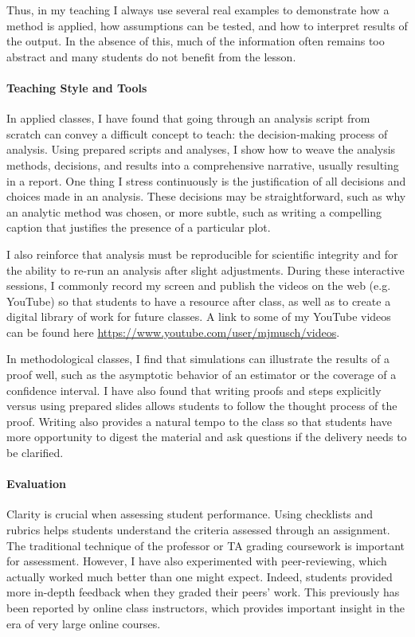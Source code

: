 \documentclass[12pt,a4paper]{article}
\begin{document}
Thus, in my teaching I always use several real examples to demonstrate how a method is applied, how assumptions can be tested, and how to interpret results of the output. In the absence of this, much of the information often remains too abstract and many students do not benefit from the lesson.


\vspace{-1em}
\paragraph{Teaching Style and Tools} In applied classes, I have found that going through an analysis script from scratch can convey a difficult concept to teach: the decision-making process of analysis.  Using prepared scripts and analyses, I show how to weave the analysis methods, decisions, and results into a comprehensive narrative, usually resulting in a report.  One thing I stress continuously is the justification of all decisions and choices made in an analysis.  These decisions may be straightforward, such as why an analytic method was chosen, or more subtle, such as writing a compelling caption that justifies the presence of a particular plot.  

I also reinforce that analysis must be reproducible for scientific integrity and for the ability to re-run an analysis after slight adjustments. During these interactive sessions, I commonly record my screen and publish the videos on the web (e.g. YouTube) so that students to have a resource after class, as well as to create a digital library of work for future classes.  A link to some of my YouTube videos can be found here \url{https://www.youtube.com/user/mjmusch/videos}.

In methodological classes, I find that simulations can illustrate the results of a proof well, such as the asymptotic behavior of an estimator or the coverage of a confidence interval.  I have also found that writing proofs and steps explicitly versus using prepared slides allows students to follow the thought process of the proof.  Writing also provides a natural tempo to the class so that students have more opportunity to digest the material and ask questions if the delivery needs to be clarified.

\vspace{-1em}
\paragraph{Evaluation} Clarity is crucial when assessing student performance.  Using checklists and rubrics helps students understand the criteria assessed through an assignment.  The traditional technique of the professor or TA grading coursework is important for assessment.  However, I have also experimented with peer-reviewing, which actually worked much better than one might expect. Indeed, students provided more in-depth feedback when they graded their peers' work. This previously has been reported by online class instructors, which provides important insight in the era of very large online courses.
\end{document}

